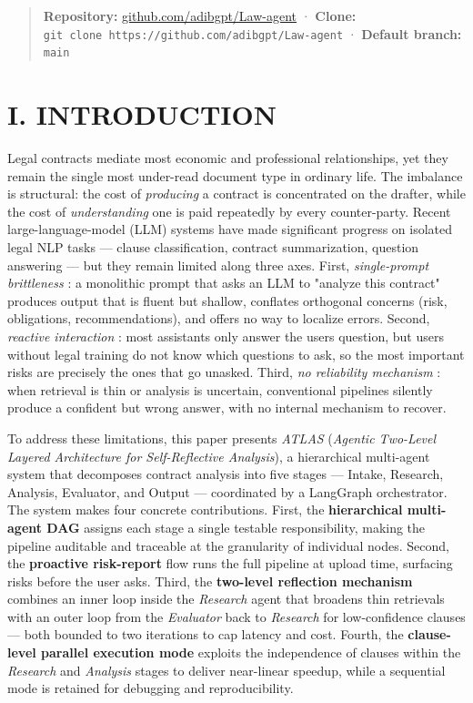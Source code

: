 \documentclass[
  twocolumn]{article}
\begin{document}
\begin{quote}
\textbf{Repository:}
\href{https://github.com/adibgpt/Law-agent}{github.com/adibgpt/Law-agent}
· \textbf{Clone:}
\texttt{git\ clone\ https://github.com/adibgpt/Law-agent} ·
\textbf{Default branch:} \texttt{main}
\end{quote}

\section{I. INTRODUCTION}\label{i.-introduction}

Legal contracts mediate most economic and professional relationships,
yet they remain the single most under-read document type in ordinary
life. The imbalance is structural: the cost of \emph{producing} a
contract is concentrated on the drafter, while the cost of
\emph{understanding} one is paid repeatedly by every counter-party.
Recent large-language-model (LLM) systems have made significant progress
on isolated legal NLP tasks --- clause classification, contract
summarization, question answering --- but they remain limited along
three axes. First, \emph{single-prompt brittleness} : a monolithic
prompt that asks an LLM to "analyze this contract" produces output that
is fluent but shallow, conflates orthogonal concerns (risk, obligations,
recommendations), and offers no way to localize errors. Second,
\emph{reactive interaction} : most assistants only answer the
user\textquotesingle s question, but users without legal training do not
know which questions to ask, so the most important risks are precisely
the ones that go unasked. Third, \emph{no reliability mechanism} : when
retrieval is thin or analysis is uncertain, conventional pipelines
silently produce a confident but wrong answer, with no internal
mechanism to recover.

To address these limitations, this paper presents \emph{ATLAS}
(\emph{Agentic Two-Level Layered Architecture for Self-Reflective
Analysis}), a hierarchical multi-agent system that decomposes contract
analysis into five stages --- Intake, Research, Analysis, Evaluator, and
Output --- coordinated by a LangGraph orchestrator. The system makes
four concrete contributions. First, the \textbf{hierarchical multi-agent
DAG} assigns each stage a single testable responsibility, making the
pipeline auditable and traceable at the granularity of individual nodes.
Second, the \textbf{proactive risk-report} flow runs the full pipeline
at upload time, surfacing risks before the user asks. Third, the
\textbf{two-level reflection mechanism} combines an inner loop inside
the \emph{Research} agent that broadens thin retrievals with an outer
loop from the \emph{Evaluator} back to \emph{Research} for
low-confidence clauses --- both bounded to two iterations to cap latency
and cost. Fourth, the \textbf{clause-level parallel execution mode}
exploits the independence of clauses within the \emph{Research} and
\emph{Analysis} stages to deliver near-linear speedup, while a
sequential mode is retained for debugging and reproducibility.
\end{document}

